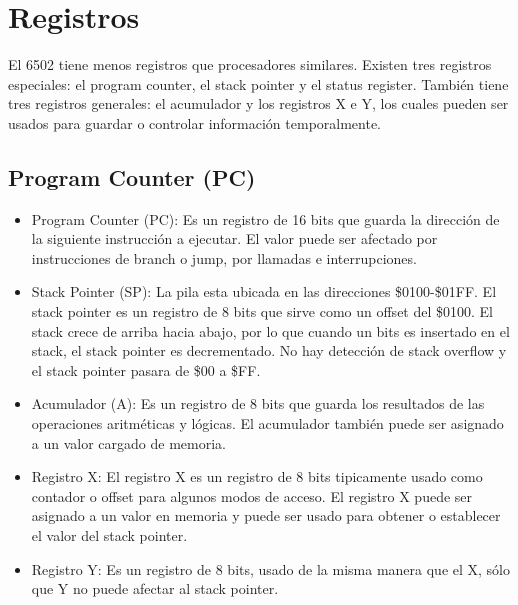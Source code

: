 \section{Registros}
El 6502 tiene menos registros que procesadores similares. Existen tres registros especiales: el program counter, el stack pointer y el status register. También tiene tres registros generales: el acumulador y los registros X e Y, los cuales pueden ser usados para guardar o controlar información temporalmente.
\subsection{Program Counter (PC)}
\begin{itemize}
\item Program Counter (PC): Es un registro de 16 bits que guarda la dirección de la siguiente instrucción a ejecutar. El valor puede ser afectado por instrucciones de branch o jump, por llamadas e interrupciones.
\item Stack Pointer (SP): La pila esta ubicada en las direcciones \$0100-\$01FF. El stack pointer es un registro de 8 bits que sirve como un offset del \$0100. El stack crece de arriba hacia abajo, por lo que cuando un bits es insertado en el stack, el stack pointer es decrementado. No hay detección de stack overflow y el stack pointer pasara de \$00 a \$FF.

\item Acumulador (A): Es un registro de 8 bits que guarda los resultados de las operaciones aritméticas y lógicas. El acumulador también puede ser asignado a un valor cargado de memoria.

\item Registro X: El registro X es un registro de 8 bits tipicamente usado como contador o offset para algunos modos de acceso. El registro X puede ser asignado a un valor en memoria y puede ser usado para obtener o establecer el valor del stack pointer.

\item Registro Y: Es un registro de 8 bits, usado de la misma manera que el X, sólo que Y no puede afectar al stack pointer.


\end{itemize}

